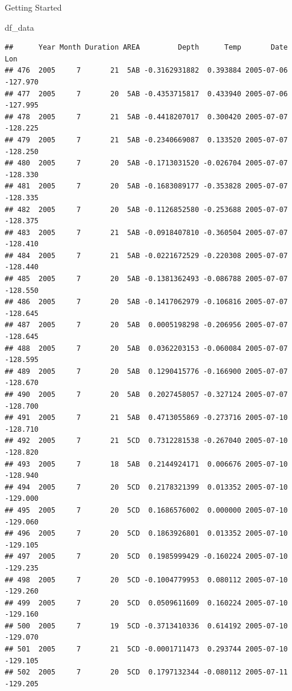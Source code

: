 \documentclass[
  ignorenonframetext,
]{beamer}
\newenvironment{Shaded}{\begin{snugshade}}{\end{snugshade}}
\newcommand{\NormalTok}[1]{#1}
\begin{document}
\begin{frame}[fragile]{Getting Started}
\protect\hypertarget{getting-started-1}{}

\begin{Shaded}
\begin{Highlighting}[]
\NormalTok{df_data}
\end{Highlighting}
\end{Shaded}

\begin{verbatim}
##      Year Month Duration AREA         Depth      Temp       Date      Lon
## 476  2005     7       21  5AB -0.3162931882  0.393884 2005-07-06 -127.970
## 477  2005     7       20  5AB -0.4353715817  0.433940 2005-07-06 -127.995
## 478  2005     7       21  5AB -0.4418207017  0.300420 2005-07-07 -128.225
## 479  2005     7       21  5AB -0.2340669087  0.133520 2005-07-07 -128.250
## 480  2005     7       20  5AB -0.1713031520 -0.026704 2005-07-07 -128.330
## 481  2005     7       20  5AB -0.1683089177 -0.353828 2005-07-07 -128.335
## 482  2005     7       20  5AB -0.1126852580 -0.253688 2005-07-07 -128.375
## 483  2005     7       21  5AB -0.0918407810 -0.360504 2005-07-07 -128.410
## 484  2005     7       21  5AB -0.0221672529 -0.220308 2005-07-07 -128.440
## 485  2005     7       20  5AB -0.1381362493 -0.086788 2005-07-07 -128.550
## 486  2005     7       20  5AB -0.1417062979 -0.106816 2005-07-07 -128.645
## 487  2005     7       20  5AB  0.0005198298 -0.206956 2005-07-07 -128.645
## 488  2005     7       20  5AB  0.0362203153 -0.060084 2005-07-07 -128.595
## 489  2005     7       20  5AB  0.1290415776 -0.166900 2005-07-07 -128.670
## 490  2005     7       20  5AB  0.2027458057 -0.327124 2005-07-07 -128.700
## 491  2005     7       21  5AB  0.4713055869 -0.273716 2005-07-10 -128.710
## 492  2005     7       21  5CD  0.7312281538 -0.267040 2005-07-10 -128.820
## 493  2005     7       18  5AB  0.2144924171  0.006676 2005-07-10 -128.940
## 494  2005     7       20  5CD  0.2178321399  0.013352 2005-07-10 -129.000
## 495  2005     7       20  5CD  0.1686576002  0.000000 2005-07-10 -129.060
## 496  2005     7       20  5CD  0.1863926801  0.013352 2005-07-10 -129.105
## 497  2005     7       20  5CD  0.1985999429 -0.160224 2005-07-10 -129.235
## 498  2005     7       20  5CD -0.1004779953  0.080112 2005-07-10 -129.260
## 499  2005     7       20  5CD  0.0509611609  0.160224 2005-07-10 -129.160
## 500  2005     7       19  5CD -0.3713410336  0.614192 2005-07-10 -129.070
## 501  2005     7       21  5CD -0.0001711473  0.293744 2005-07-10 -129.105
## 502  2005     7       20  5CD  0.1797132344 -0.080112 2005-07-11 -129.205

\end{verbatim}
\end{frame}
\end{document}
